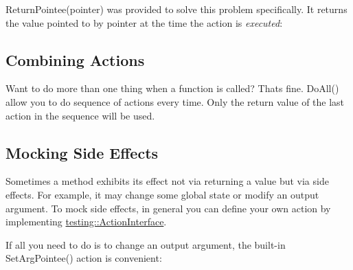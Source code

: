 {\ttfamily Return\+Pointee(pointer)} was provided to solve this problem specifically. It returns the value pointed to by {\ttfamily pointer} at the time the action is {\itshape executed}\+:


\begin{DoxyCode}{0}
\end{DoxyCode}


\subsection*{Combining Actions}

Want to do more than one thing when a function is called? That\textquotesingle{}s fine. {\ttfamily Do\+All()} allow you to do sequence of actions every time. Only the return value of the last action in the sequence will be used.


\begin{DoxyCode}{0}
\DoxyCodeLine{}
\DoxyCodeLine{\};}
\DoxyCodeLine{}
\end{DoxyCode}


\subsection*{Mocking Side Effects}

Sometimes a method exhibits its effect not via returning a value but via side effects. For example, it may change some global state or modify an output argument. To mock side effects, in general you can define your own action by implementing {\ttfamily \mbox{\hyperlink{classtesting_1_1_action_interface}{testing\+::\+Action\+Interface}}}.

If all you need to do is to change an output argument, the built-\/in {\ttfamily Set\+Arg\+Pointee()} action is convenient\+:


